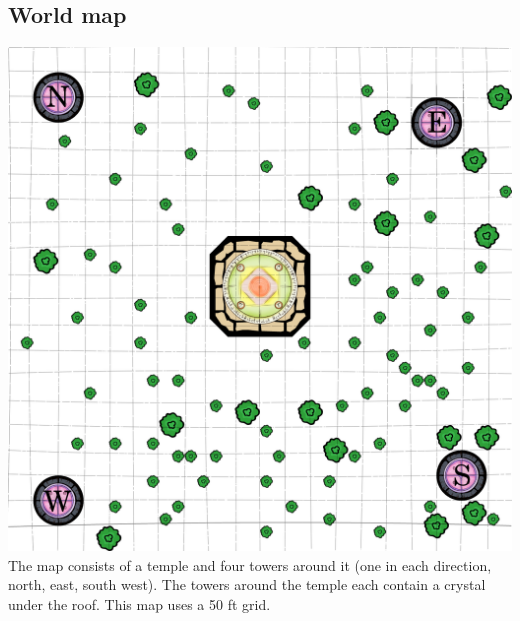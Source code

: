 \documentclass[a4paper,10pt,twoside,twocolumn,bg=print]{dndbook} %
\begin{document}
		\subsection{World map}
		\includegraphics[width=\linewidth]{Map50Grid.png}
		\vspace*{4cm}\linebreak
		The map consists of a temple and four towers around it (one in each direction, north, east, south west). The towers around the temple each contain a crystal under the roof. This map uses a 50 ft grid.
		\vfill
		\pagebreak
\end{document}
